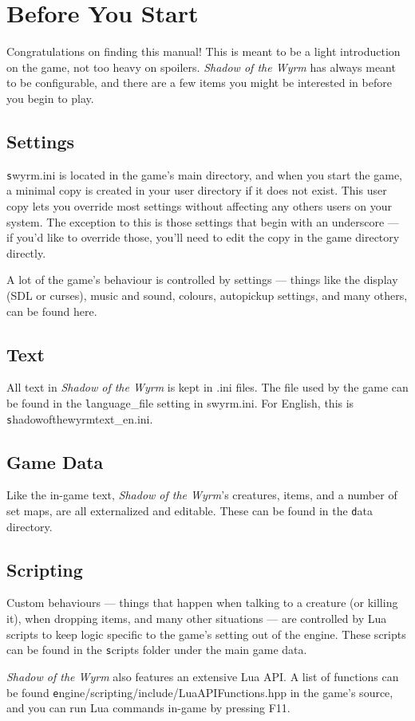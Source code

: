 \section{Before You Start}

Congratulations on finding this manual! This is meant to be a light introduction on the game, not too heavy on spoilers. {\it Shadow of the Wyrm} has always meant to be configurable, and there are a few items you might be interested in before you begin to play.

\subsection{Settings}

{\texttt swyrm.ini} is located in the game's main directory, and when you start the game, a minimal copy is created in your user directory if it does not exist. This user copy lets you override most settings without affecting any others users on your system. The exception to this is those settings that begin with an underscore --- if you'd like to override those, you'll need to edit the copy in the game directory directly.

A lot of the game's behaviour is controlled by settings --- things like the display (SDL or curses), music and sound, colours, autopickup settings, and many others, can be found here.

\subsection{Text}

All text in {\it Shadow of the Wyrm} is kept in .ini files. The file used by the game can be found in the {\texttt language\_file} setting in swyrm.ini. For English, this is {\texttt shadowofthewyrmtext\_en.ini}.

\subsection{Game Data}

Like the in-game text, {\it Shadow of the Wyrm}'s creatures, items, and a number of set maps, are all externalized and editable. These can be found in the {\texttt data} directory.

\subsection{Scripting}

Custom behaviours --- things that happen when talking to a creature (or killing it), when dropping items, and many other situations --- are controlled by Lua scripts to keep logic specific to the game's setting out of the engine. These scripts can be found in the {\texttt scripts} folder under the main game data.

{\it Shadow of the Wyrm} also features an extensive Lua API. A list of functions can be found {\texttt engine/scripting/include/LuaAPIFunctions.hpp} in the game's source, and you can run Lua commands in-game by pressing F11.
